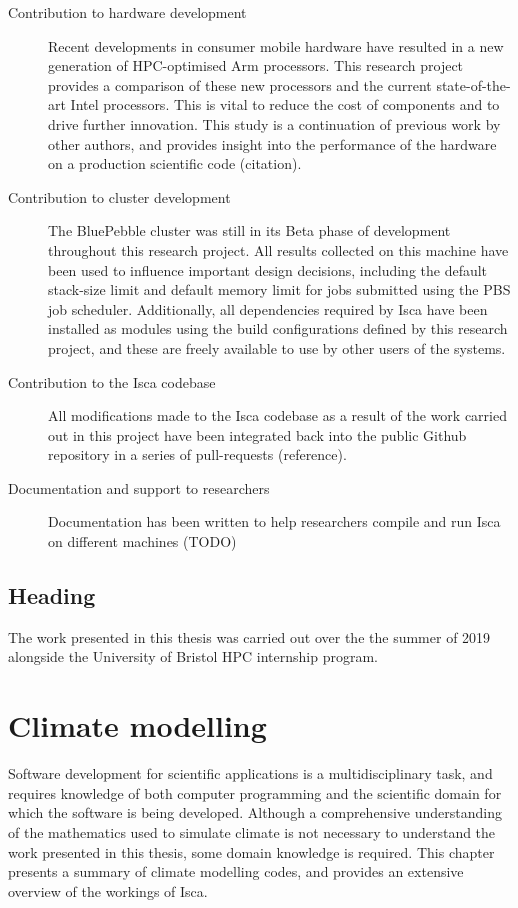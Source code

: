 \documentclass[a4paper,11pt]{report}
\begin{document}
\begin{description}
	\item[Contribution to hardware development] Recent developments in consumer mobile hardware have resulted in a new generation of HPC-optimised Arm processors. This research project provides a comparison of these new processors and the current state-of-the-art Intel processors. This is vital to reduce the cost of components and to drive further innovation. This study is a continuation of previous work by other authors, and provides insight into the performance of the hardware on a production scientific code (citation).
	
	\item[Contribution to cluster development] The BluePebble cluster was still in its Beta phase of development throughout this research project. All results collected on this machine have been used to influence important design decisions, including the default stack-size limit and default memory limit for jobs submitted using the PBS job scheduler. Additionally, all dependencies required by Isca have been installed as modules using the build configurations defined by this research project, and these are freely available to use by other users of the systems. 
	
	\item[Contribution to the Isca codebase] All modifications made to the Isca codebase as a result of the work carried out in this project have been integrated back into the public Github repository in a series of pull-requests (reference). 
	
	\item[Documentation and support to researchers] Documentation has been written to help researchers compile and run Isca on different machines (TODO)
	
\end{description}


\section{Heading}
The work presented in this thesis was carried out over the the summer of 2019 alongside the University of Bristol HPC internship program. 




\chapter{Climate modelling}
\label{chap:background}
Software development for scientific applications is a multidisciplinary task, and requires knowledge of both computer programming and the scientific domain for which the software is being developed. Although a comprehensive understanding of the mathematics used to simulate climate is not necessary to understand the work presented in this thesis, some domain knowledge is required. This chapter presents a summary of climate modelling codes, and provides an extensive overview of the workings of Isca.
\end{document}
